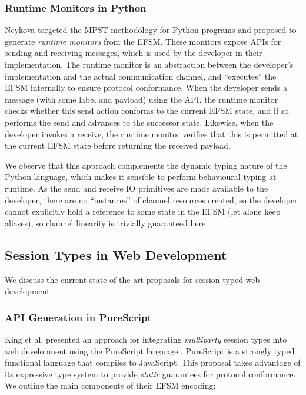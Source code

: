 \subsubsection{Runtime Monitors in Python \cite{Python2017} }
Neykova targeted the MPST methodology 
for Python programs
and proposed to generate \textit{runtime monitors} 
from the EFSM.
These monitors expose APIs for sending and receiving messages,
which is used by the developer in their implementation. 
The runtime monitor is an abstraction between the 
developer's implementation and the actual communication channel, 
and ``executes'' the EFSM internally to ensure protocol conformance. 
When the developer sends a message (with some label and payload) 
using the API, the runtime monitor checks 
whether this send action conforms to the current EFSM state, 
and if so, 
performs the send and advances to the successor state. 
Likewise, when the developer invokes a receive, 
the runtime monitor verifies that this is permitted 
at the current EFSM state before returning the received payload.

We observe that this approach complements the 
dynamic typing nature of the Python language, 
which makes it sensible to perform behavioural typing at runtime.
As the send and receive IO primitives are
made available to the developer,
there are no ``instances'' of channel resources created,
so the developer cannot explicitly hold a reference to
some state in the EFSM (let alone keep aliases),
so channel linearity is trivially guaranteed here.

\subsection{Session Types in Web Development}
\label{subsection:sessiontypewebdev}

We discuss the current state-of-the-art proposals
for session-typed web development.

\subsubsection{API Generation in PureScript \cite{PureScript2019}}
King et al. presented an approach
for integrating \textit{multiparty} session types 
into web development using 
the PureScript language \cite{PureScript}.
PureScript is a strongly typed functional language
that compiles to JavaScript.
This proposal takes advantage of its expressive type system to 
provide \textit{static} guarantees for protocol conformance.
We outline the main components of their EFSM encoding:

